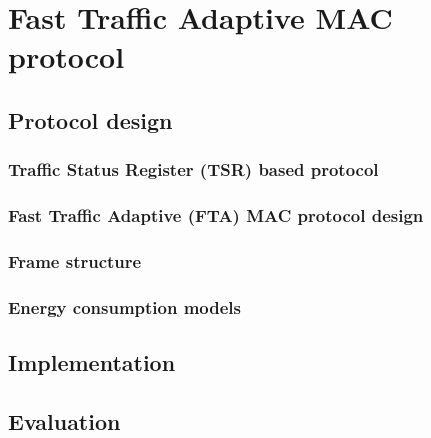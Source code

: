 \chapter{Fast Traffic Adaptive MAC protocol}
\label{ftamac}
\section{Protocol design}
\subsection{Traffic Status Register (TSR) based protocol}
\subsection{Fast Traffic Adaptive (FTA) MAC protocol design}
\subsection{Frame structure}
\label{sec:fta_frame_structure}
\subsection{Energy consumption models}
\label{sec:fta_energy_model}
\section{Implementation}
\section{Evaluation}